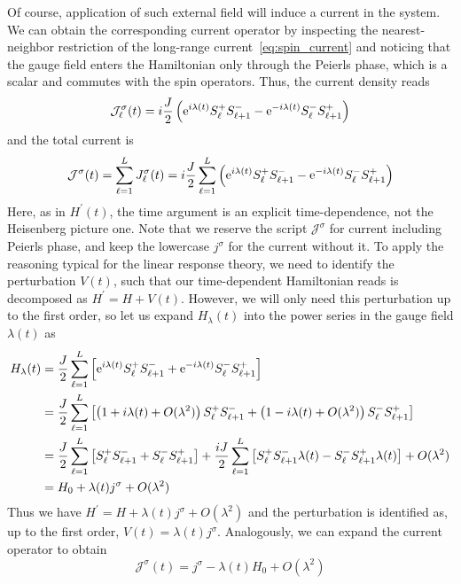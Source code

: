 Of course, application of such external field will induce a current in the system. We can obtain the
corresponding current operator by inspecting the nearest-neighbor restriction of the long-range
current~\eqref{eq:spin_current} and noticing that the gauge field enters the Hamiltonian only through
the Peierls phase, which is a scalar and commutes with the spin operators. Thus, the current density
reads
\begin{equation}
    \mathcal{J}^{\sigma }_{\ell}(t) = i\frac{J}{2} \left( \mathrm{e}^{i \lambda(t)} S^{+}_{\ell} S^{-}_{\ell+1} - \mathrm{e}^{-i \lambda(t)} S^{-}_{\ell}S^{+}_{\ell+1} \right)
\end{equation}
and the total current is
\begin{equation}
    \mathcal{J}^{\sigma } (t) = \sum_{\ell=1}^{L} J^{\sigma }_{\ell}(t)
    = i\frac{J}{2} \sum_{\ell=1}^{L} \left( \mathrm{e}^{i \lambda(t)} S^{+}_{\ell} S^{-}_{\ell+1} - \mathrm{e}^{-i \lambda(t)} S^{-}_{\ell}S^{+}_{\ell+1} \right)
    \label{eq:total_current}
\end{equation}
Here, as in \(H^{\prime} (t)\), the time argument is an explicit time-dependence, not the Heisenberg picture one.
Note that we reserve the script \(\mathcal{J}^{\sigma}\) for current including Peierls phase,
and keep the lowercase \(j^{\sigma }\) for the current without it.
To apply the reasoning typical for the linear response theory, we need to identify the perturbation
\(V(t)\), such that our time-dependent Hamiltonian reads is decomposed as \(H^{\prime} = H + V(t)\).
However, we will only need this perturbation up to the first order, so let us expand \(H_{\lambda }(t)\)  into the
power series in the gauge field \(\lambda(t)\) as
\begin{align}
    H_{\lambda }(t) & = \frac{J}{2} \sum_{\ell=1}^{L} \left[\mathrm{e}^{i \lambda(t)} S^{+}_{\ell} S^{-}_{\ell+1}
    + \mathrm{e}^{-i \lambda(t)} S^{-}_{\ell}S^{+}_{\ell+1} \right] \nonumber                                                                             \\
                    & = \frac{J}{2} \sum_{\ell=1}^{L} \left[\left( 1 + i \lambda (t) + O(\lambda ^2) \right)  S^{+}_{\ell} S^{-}_{\ell+1}
    + \left( 1 - i \lambda (t) + O(\lambda ^2) \right) S^{-}_{\ell}S^{+}_{\ell+1} \right] \nonumber                                                       \\
                    & = \frac{J}{2} \sum_{\ell=1}^{L} \left[ S^{+}_{\ell} S^{-}_{\ell+1} + S^{-}_{\ell}S^{+}_{\ell+1} \right] +
    \frac{i J}{2} \sum_{\ell=1}^{L} \left[ S^{+}_{\ell} S^{-}_{\ell+1} \lambda (t) - S^{-}_{\ell}S^{+}_{\ell+1} \lambda (t) \right] + O(\lambda ^2) \nonumber \\
                    & = H_0 + \lambda(t) j^{\sigma } + O(\lambda ^2)
\end{align}
Thus we have \(H^{\prime} = H + \lambda (t) j^{\sigma } + O(\lambda ^2)\) and the perturbation is
identified as, up to the first order, \(V(t) = \lambda (t) j^{\sigma }\).
Analogously, we can expand the current operator to obtain
\begin{equation}
    \mathcal{J}^{\sigma } (t) = j^{\sigma } - \lambda(t) H_0 + O(\lambda ^2)
\end{equation}

